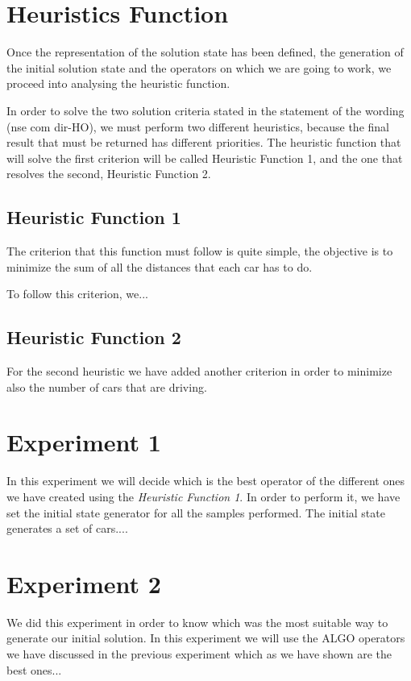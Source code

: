 \documentclass[12]{article}
\begin{document}
\section{Heuristics Function}
Once the representation of the solution state has been defined, the generation of the initial solution state and the operators on which we are going to work, we proceed into analysing the heuristic function. 

In order to solve the two solution criteria stated in the statement of the wording (nse com dir-HO), we must perform two different heuristics, because the final result that must be returned has different priorities. The heuristic function that will solve the first criterion will be called Heuristic Function 1, and the one that resolves the second, Heuristic Function 2. 

\subsection{Heuristic Function 1}

The criterion that this function must follow is quite simple, the objective is to minimize the sum of all the distances that each car has to do.

To follow this criterion, we...

\subsection{Heuristic Function 2}

For the second heuristic we have added another criterion in order to minimize also the number of cars that are driving. 


\section{Experiment 1}
In this experiment we will decide which is the best operator of the different ones we have created using the \textit{Heuristic Function 1}. In order to perform it, we have set the initial state generator for all the samples performed. The initial state generates a set of cars....

\section{Experiment 2}
We did this experiment in order to know which was the most suitable way to generate our initial solution. In this experiment we will use the  ALGO operators we have discussed in the previous experiment which as we have shown are the best ones...
\end{document}
